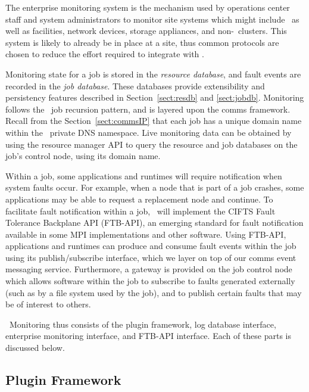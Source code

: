 The enterprise monitoring system is the mechanism used by operations center
staff and system administrators to monitor site systems which might include
\ngrm\ as well as facilities, network devices, storage appliances,
and non-\ngrm\ clusters.
This system is likely to already be in place at a site, thus common
protocols are chosen to reduce the effort required to integrate with \ngrm.

Monitoring state for a job is stored in the {\em resource database}, and
fault events are recorded in the {\em job database}.
These databases provide extensibility and persistency features described
in Section~\ref{sect:resdb} and \ref{sect:jobdb}.
Monitoring follows the \ngrm\ job recursion pattern, and is layered upon
the comms framework.  Recall from the Section~\ref{sect:commsIP} that
each job has a unique domain name within the \ngrm\ private
DNS namespace.  Live monitoring data can be obtained by using the resource
manager API to query the resource and job databases on the job's control
node, using its domain name.

Within a job, some applications and runtimes will require notification
when system faults occur.
For example, when a node that is part of a job crashes, some applications
may be able to request a replacement node and continue.
To facilitate fault notification within a job, \ngrm\ will
implement the CIFTS Fault Tolerance Backplane API\cite{FTBAPI} (FTB-API),
an emerging standard for fault notification available in some MPI
implementations and other software.
Using FTB-API, applications and runtimes can produce and consume fault
events within the job using its publish/subscribe interface, which we layer on
top of our comms event messaging service.  Furthermore, a gateway is provided
on the job control node which allows software within the job to subscribe
to faults generated externally (such as by a file system used by the job),
and to publish certain faults that may be of interest to others.

\ngrm\ Monitoring thus consists of
the plugin framework, 
log database interface,
enterprise monitoring interface,
and FTB-API interface.
Each of these parts is discussed below.

\subsection{Plugin Framework}

